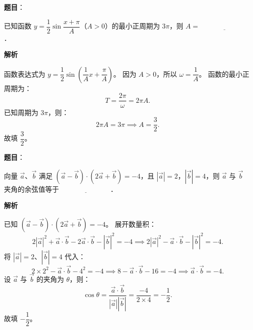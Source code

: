 \begin{answer}

\textbf{题目}：

已知函数 $y=\dfrac{1}{2}\sin\dfrac{x+\pi}{A}$（$A>0$）的最小正周期为 $3\pi$，则 $A=\underline{\hspace{3cm}}$．

\textbf{解析}

函数表达式为 $y=\dfrac{1}{2}\sin\left(\dfrac{1}{A}x+\dfrac{\pi}{A}\right)$。
因为 $A>0$，所以 $\omega=\dfrac{1}{A}$。
函数的最小正周期为：
\nopagebreak[4]
\[
T=\frac{2\pi}{\omega}=2\pi A.
\]
已知周期为 $3\pi$，则：
\nopagebreak[4]
\[
2\pi A=3\pi\implies A=\frac{3}{2}.
\]
故填 $\dfrac{3}{2}$。


\end{answer}
\begin{answer}

\textbf{题目}：

向量 $\vec{a}$、$\vec{b}$ 满足 $(\vec{a}-\vec{b})\cdot(2\vec{a}+\vec{b})=-4$，且 $|\vec{a}|=2$，$|\vec{b}|=4$，则 $\vec{a}$ 与 $\vec{b}$ 夹角的余弦值等于 $\underline{\hspace{3cm}}$．

\textbf{解析}

已知 $(\vec{a}-\vec{b})\cdot(2\vec{a}+\vec{b})=-4$。
展开数量积：
\nopagebreak[4]
\[
2|\vec{a}|^2+\vec{a}\cdot\vec{b}-2\vec{a}\cdot\vec{b}-|\vec{b}|^2=-4\implies 2|\vec{a}|^2-\vec{a}\cdot\vec{b}-|\vec{b}|^2=-4.
\]
将 $|\vec{a}|=2$、$|\vec{b}|=4$ 代入：
\nopagebreak[4]
\[
2\times 2^2-\vec{a}\cdot\vec{b}-4^2=-4\implies 8-\vec{a}\cdot\vec{b}-16=-4\implies\vec{a}\cdot\vec{b}=-4.
\]
设 $\vec{a}$ 与 $\vec{b}$ 的夹角为 $\theta$，则：
\nopagebreak[4]
\[
\cos\theta=\frac{\vec{a}\cdot\vec{b}}{|\vec{a}||\vec{b}|}=\frac{-4}{2\times 4}=-\frac{1}{2}.
\]
故填 $-\dfrac{1}{2}$。


\end{answer}
